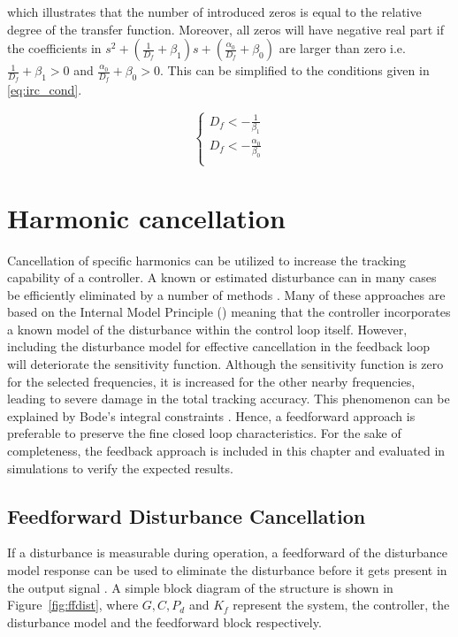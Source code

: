 which illustrates that the number of introduced zeros is equal to the relative degree of the transfer function. Moreover, all zeros will have negative real part if the coefficients in $s^2 + (\frac{1}{D_f} + \beta_1)s + (\frac{\alpha_0}{D_f} + \beta_0)$  are larger than zero i.e. $ \frac{1}{D_f} + \beta_1>0$ and $\frac{\alpha_0}{D_f} + \beta_0>0$. This can be simplified to the conditions given in \eqref{eq:irc_cond}.

\begin{equation}
  \label{eq:irc_cond}
  \begin{cases}
    D_f < -\frac{1}{\beta_1}\\
    D_f < -\frac{\alpha_0}{\beta_0}\\
  \end{cases}
\end{equation}
\newpage

\section{Harmonic cancellation}
Cancellation of specific harmonics can be utilized to increase the tracking capability of a controller. A known or estimated disturbance can in many cases be efficiently eliminated by a number of methods \citep{fujimoto2009rro, fujimoto2004repetitive, vilanova2008disturbance}. Many of these approaches are based on the Internal Model Principle (\abbrIMP) meaning that the controller incorporates a known model of the disturbance within the control loop itself. However, including the disturbance model for effective cancellation in the feedback loop will deteriorate the sensitivity function. Although the sensitivity function is zero for the selected frequencies, it is increased for the other nearby frequencies, leading to severe damage in the total tracking accuracy. This phenomenon can be explained by Bode's integral constraints \citep{Ljung:2003}. Hence, a feedforward approach is preferable to preserve the fine closed loop characteristics. For the sake of completeness, the \abbrIMP feedback approach is included in this chapter and evaluated in simulations to verify the expected results.

\subsection{Feedforward Disturbance Cancellation}\label{subsec:distff}
If a disturbance is measurable during operation, a feedforward of the disturbance model response can be used to eliminate the disturbance before it gets present in the output signal \citep{industrial}. A simple block diagram of the structure is shown in Figure~\ref{fig:ffdist}, where $G, C, P_d$ and $K_f$ represent the system, the controller, the disturbance model and the feedforward block respectively.


